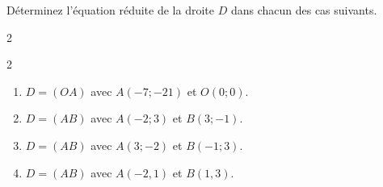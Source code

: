 \documentclass[main.tex]{subfiles}
\begin{document}
\begin{exercise} 
	Déterminez l'équation réduite de la droite $D$ dans chacun des cas suivants.
	\vspace{-0.5em}
	\begin{multicols}{2}
		\begin{spacing}{2} 
			\begin{enumerate}[ label=\arabic*), leftmargin=*]
				\item $D=(OA)$ avec $A(-7;-21)$ et $O(0;0)$.
\item $D=(AB)$ avec  $A(-2;3)$ et $B(3;-1)$. 
\item $D=(AB)$ avec  $A(3;-2)$ et $B(-1;3)$. 
\item $D=(AB)$ avec $A(-2,1)$ et $B(1,3)$.
			\end{enumerate}
		\end{spacing}
	\end{multicols}
\end{exercise}\vspace{-1em} 

%	 

\newpage 
\end{document}
